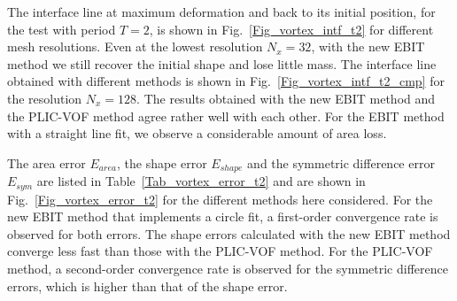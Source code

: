 The interface line at maximum deformation and back to its initial position, for the test with period $T = 2$, is shown in Fig.~\ref{Fig_vortex_intf_t2} for different mesh resolutions. Even at the lowest resolution $N_x = 32$, with the new EBIT method we still recover the initial shape and lose little mass. 
The interface line obtained with different methods is shown in Fig.~\ref{Fig_vortex_intf_t2_cmp} for the resolution $N_x = 128$. The results obtained with the new EBIT method and the PLIC-VOF method agree rather well with each other. For the EBIT method with a straight line fit, we observe a considerable amount of area loss.

The area error $E_{area}$, the shape error $E_{shape}$ and the symmetric difference error $E_{sym}$ are listed in Table~\ref{Tab_vortex_error_t2} and are shown in Fig.~\ref{Fig_vortex_error_t2} for the different methods here considered. For the new EBIT method that implements a circle fit, a first-order convergence rate is observed for both errors. The shape errors calculated with the new EBIT method converge less fast than those with the PLIC-VOF method. For the PLIC-VOF method, a second-order convergence rate is observed for the symmetric difference errors, which is higher than that of the shape error.

